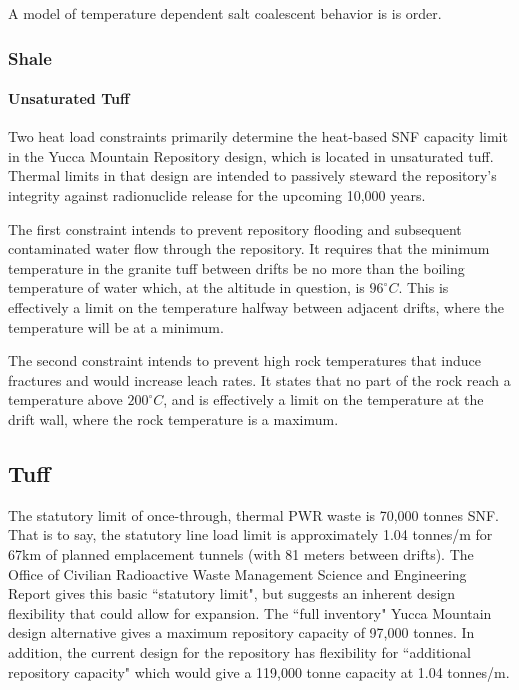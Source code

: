A model of temperature dependent salt coalescent behavior is is order. 


\subsubsection{Shale}


\paragraph{Unsaturated Tuff}

Two heat load constraints primarily determine the heat-based SNF 
capacity limit in the Yucca Mountain Repository design, which is 
located in unsaturated tuff. Thermal limits in that design are 
intended to passively steward the repository's integrity against 
radionuclide release for the upcoming 10,000 years.

The first constraint intends to prevent repository flooding and 
subsequent contaminated water flow through the repository. It requires 
that the minimum temperature in the granite tuff between drifts be no 
more than the boiling temperature of water which, at the altitude in 
question, is $96^{\circ}C$. This is effectively a limit on the 
temperature halfway between adjacent drifts, where the temperature 
will be at a minimum.

The second constraint intends to prevent high rock temperatures that 
induce fractures and would increase leach rates. It states that no 
part of the rock reach a temperature above $200^{\circ}C$, and is 
effectively a limit on the temperature at the drift wall, where the 
rock temperature is a maximum.  

\subsection{Tuff}




The statutory limit of once-through, thermal PWR waste is 70,000 
tonnes SNF. That is to say, the statutory line load limit is 
approximately 1.04 tonnes/m for 67km of planned emplacement tunnels 
(with 81 meters between drifts). The Office of Civilian Radioactive 
Waste Management Science and Engineering Report gives this basic 
``statutory limit", but suggests an inherent design flexibility that 
could allow for expansion. The ``full inventory" Yucca Mountain design 
alternative gives a maximum repository capacity of 97,000 tonnes. In 
addition, the current design for the repository has flexibility for 
``additional repository capacity" which would give a 119,000 tonne 
capacity at 1.04 tonnes/m.\cite{ doe_yucca_2002}

